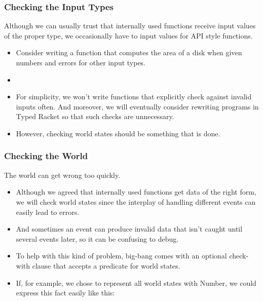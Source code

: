 \documentclass{beamer}
\begin{document}
\begin{frame}
  \frametitle{Checking the Input Types}
  Although we can usually trust that internally used functions
  receive input values of the proper type, we occasionally have to
  input values for API style functions.
  \begin{itemize}
  \item<2-> Consider writing a function that computes the area of a disk
    when given numbers and errors for other input types.
  \item<3-> \CheckedArea
  \item<4-> For simplicity, we won't write functions that explicitly check
    against invalid inputs often. And moreover, we will eventually consider
    rewriting programs in Typed Racket so that such checks are unnecessary.
  \item<5-> However, checking world states should be something that is done.
  \end{itemize}
\end{frame}


\begin{frame}
  \frametitle{Checking the World}
  The world can get wrong too quickly.
  \begin{itemize}
  \item<2-> Although we agreed that internally used functions get data
    of the right form, we will check world states since the interplay of handling
    different events can easily lead to errors.
  \item<3-> And sometimes an event can produce invalid data that isn't caught
    until several events later, so it can be confusing to debug.
  \item<4-> To help with this kind of problem, big-bang comes with an optional check-with clause that accepts a predicate for world states.
  \item<5-> If, for example, we chose to represent all world states with Number, we could express this fact easily like this: \CheckNumber
  \end{itemize}
\end{frame}

\end{document}
